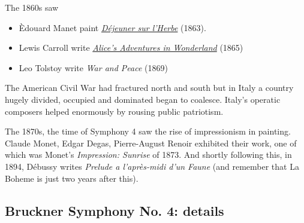The 1860s saw 
\begin{itemize}
\item \`Edouard Manet paint \textit{\href{https://www.khanacademy.org/humanities/becoming-modern/avant-garde-france/realism/v/manet-le-d-jeuner-sur-l-herbe-luncheon-on-the-grass-1863}{D\'ejeuner sur l'Herbe}} (1863).
\item Lewis Carroll write \textit{\href{http://www.gutenberg.org/files/11/11-h/11-h.htm}{Alice's Adventures in Wonderland}} (1865)
\item Leo Tolstoy write \textit{War and Peace} (1869)
\end{itemize}

The American Civil War had fractured north and south but in Italy a country hugely divided, occupied and dominated began to coalesce. Italy's operatic composers helped enormously by rousing public patriotism.

The 1870s, the time of Symphony 4 saw the rise of impressionism in painting. Claude Monet, Edgar Degas, Pierre-August Renoir exhibited their work, one of which was Monet's \textit{Impression: Sunrise} of 1873. 
And shortly following this, in 1894, D\'ebussy writes \textit{Prelude a l'apr\`es-midi d'un Faune} (and remember that La Boheme is just two years after this). 

\subsection{Bruckner Symphony No. 4: details} 













